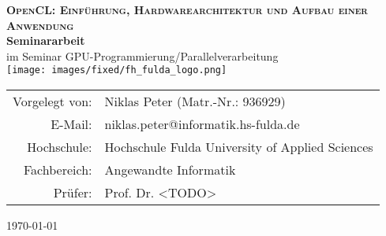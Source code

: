 \thispagestyle{plain}
\begin{titlepage}

\begin{center}

\huge{\textbf{\textsc{OpenCL: Einführung, Hardwarearchitektur und Aufbau einer Anwendung}}}\\[1.5ex]

\LARGE{\textbf{Seminararbeit}}\\[1.5ex]
\Large{im Seminar GPU-Programmierung/Parallelverarbeitung}\\[6ex]
\vfill
\texttt{[image: images/fixed/fh\_fulda\_logo.png]}\\[3ex]

\normalsize
 \vfill
\begin{tabular}{rl}
 Vorgelegt von: &  Niklas Peter (Matr.-Nr.: 936929) \\[0ex]
 E-Mail: & niklas.peter@informatik.hs-fulda.de \\
 Hochschule: & Hochschule Fulda \textendash{} University of Applied Sciences \\[0ex]
 Fachbereich: & Angewandte Informatik \\[0ex]
 Prüfer:         & Prof. Dr. <TODO> \\[0ex]
\end{tabular}
\end{center}		

\singlespacing
\small
\begin{center}
\today
\end{center}

\end{titlepage}


